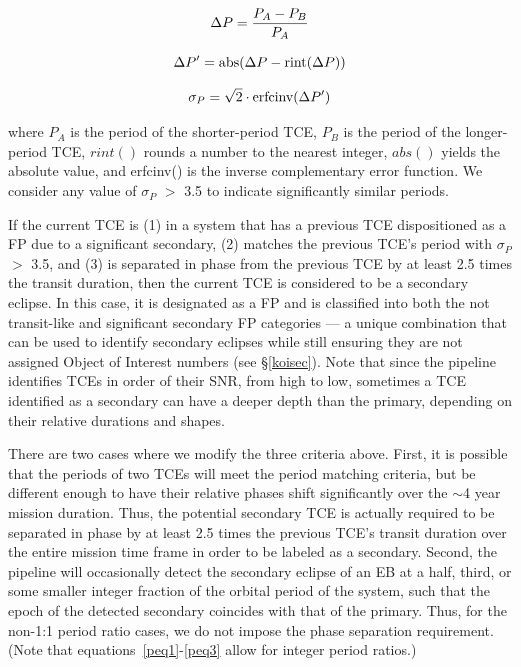 \begin{equation}
\label{peq1}
\Delta P = \frac{P_{A}-P_{B}}{P_{A}}\\
\end{equation}

\begin{equation}
\label{peq2}
\Delta P^{\prime} = \textrm{abs}(\Delta P - \textrm{rint}(\Delta P))\\
\end{equation}

\begin{equation}
\label{peq3}
\sigma_{P} = \sqrt{2}\cdot\textrm{erfcinv}(\Delta P^{\prime})\\
\end{equation}

\noindent where $P_{A}$ is the period of the shorter-period TCE, $P_{B}$ is the period of the longer-period TCE, $rint()$ rounds a number to the nearest integer, $abs()$ yields the absolute value, and erfcinv() is the inverse complementary error function. We consider any value of $\sigma_{P}$ $>$ 3.5 to indicate significantly similar periods.

If the current TCE is (1) in a system that has a previous TCE dispositioned as a FP due to a significant secondary, (2) matches the previous TCE's period with $\sigma_{P}$ $>$ 3.5, and (3) is separated in phase from the previous TCE by at least 2.5 times the transit duration, then the current TCE is considered to be a secondary eclipse. In this case, it is designated as a FP and is classified into both the not transit-like and significant secondary FP categories --- a unique combination that can be used to identify secondary eclipses while still ensuring they are not assigned \kepler{} Object of Interest numbers (see \S\ref{koisec}). Note that since the \kepler{} pipeline identifies TCEs in order of their SNR, from high to low, sometimes a TCE identified as a secondary can have a deeper depth than the primary, depending on their relative durations and shapes.

There are two cases where we modify the three criteria above. First, it is possible that the periods of two TCEs will meet the period matching criteria, but be different enough to have their relative phases shift significantly over the $\sim$4 year mission duration. Thus, the potential secondary TCE is actually required to be separated in phase by at least 2.5 times the previous TCE's transit duration over the entire mission time frame in order to be labeled as a secondary. Second, the \kepler{} pipeline will occasionally detect the secondary eclipse of an EB at a half, third, or some smaller integer fraction of the orbital period of the system, such that the epoch of the detected secondary coincides with that of the primary. Thus, for the non-1:1 period ratio cases, we do not impose the phase separation requirement. (Note that equations~\ref{peq1}-\ref{peq3} allow for integer period ratios.)



